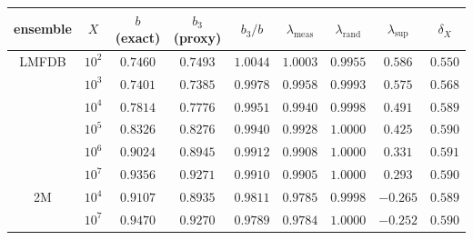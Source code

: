 \begin{tabular}{@{}cc ccc ccc c@{}}
\toprule
ensemble & $X$ & $b$ (exact) & $b_{3}$ (proxy) & $b_{3}/b$ & $\lambda_{\mathrm{meas}}$ & $\lambda_{\mathrm{rand}}$ & $\lambda_{\sup}$ & $\delta_{X}$\\
\midrule
LMFDB & $10^{2}$ & $0.7460$ & $0.7493$ & $1.0044$ & $1.0003$ & $0.9955$ & $0.586$ & $0.550$\\
 & $10^{3}$ & $0.7401$ & $0.7385$ & $0.9978$ & $0.9958$ & $0.9993$ & $0.575$ & $0.568$\\
 & $10^{4}$ & $0.7814$ & $0.7776$ & $0.9951$ & $0.9940$ & $0.9998$ & $0.491$ & $0.589$\\
 & $10^{5}$ & $0.8326$ & $0.8276$ & $0.9940$ & $0.9928$ & $1.0000$ & $0.425$ & $0.590$\\
 & $10^{6}$ & $0.9024$ & $0.8945$ & $0.9912$ & $0.9908$ & $1.0000$ & $0.331$ & $0.591$\\
 & $10^{7}$ & $0.9356$ & $0.9271$ & $0.9910$ & $0.9905$ & $1.0000$ & $0.293$ & $0.590$\\
\midrule
2M & $10^{4}$ & $0.9107$ & $0.8935$ & $0.9811$ & $0.9785$ & $0.9998$ & $-0.265$ & $0.589$\\
 & $10^{7}$ & $0.9470$ & $0.9270$ & $0.9789$ & $0.9784$ & $1.0000$ & $-0.252$ & $0.590$\\
\bottomrule
\end{tabular}
